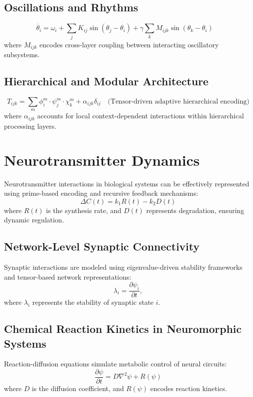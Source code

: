\documentclass{article}
\theoremstyle{plain}
\begin{document}
\subsection{Oscillations and Rhythms}
\begin{equation}
    \dot{\theta_i} = \omega_i + \sum_{j} K_{ij} \sin(\theta_j - \theta_i) 
    + \gamma \sum_{k} M_{ijk} \sin(\theta_k - \theta_i) 
    \quad 
\end{equation}
where $M_{ijk}$ encodes cross-layer coupling between interacting oscillatory subsystems.

\subsection{Hierarchical and Modular Architecture}
\begin{equation}
    T_{ijk} = \sum_m \phi_{i}^m \cdot \psi_j^m \cdot \chi_k^m + \alpha_{ijk} \delta_{ij} 
    \quad \text{(Tensor-driven adaptive hierarchical encoding)}
\end{equation}
where $\alpha_{ijk}$ accounts for local context-dependent interactions within hierarchical processing layers.
\section{Neurotransmitter Dynamics}
Neurotransmitter interactions in biological systems can be effectively represented using prime-based encoding and recursive feedback mechanisms:
\begin{equation}
    \Delta C(t) = k_1 R(t) - k_2 D(t)
\end{equation}
where $R(t)$ is the synthesis rate, and $D(t)$ represents degradation, ensuring dynamic regulation.

\subsection{Network-Level Synaptic Connectivity}
Synaptic interactions are modeled using eigenvalue-driven stability frameworks and tensor-based network representations:
\begin{equation}
    \lambda_i = \frac{\partial \psi_i}{\partial t},
\end{equation}
where $\lambda_i$ represents the stability of synaptic state $i$.

\subsection{Chemical Reaction Kinetics in Neuromorphic Systems}
Reaction-diffusion equations simulate metabolic control of neural circuits:
\begin{equation}
    \frac{\partial \psi}{\partial t} = D\nabla^2 \psi + R(\psi)
\end{equation}
where $D$ is the diffusion coefficient, and $R(\psi)$ encodes reaction kinetics.
\end{document}
